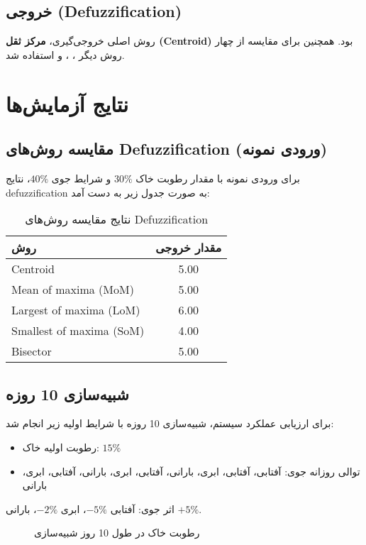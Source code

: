 \documentclass[a4paper,12pt]{article}
\begin{document}
	\subsection{خروجی (Defuzzification)}
	روش اصلی خروجی‌گیری، \textbf{مرکز ثقل (Centroid)} بود. همچنین برای مقایسه از چهار روش دیگر ، ،  و  استفاده شد.
	
	\section{نتایج آزمایش‌ها}
	
	\subsection{مقایسه روش‌های Defuzzification (ورودی نمونه)}
	برای ورودی نمونه با مقدار رطوبت خاک \(30\%\) و شرایط جوی \(40\%\)، نتایج defuzzification به صورت جدول زیر به دست آمد:
	
	\begin{table}[h]
		\centering
		\caption{نتایج مقایسه روش‌های Defuzzification}
		\begin{tabular}{lc}
			\hline
			روش & مقدار خروجی \\
			\hline
			Centroid & 5.00 \\
			Mean of maxima (MoM) & 5.00 \\
			Largest of maxima (LoM) & 6.00 \\
			Smallest of maxima (SoM) & 4.00 \\
			Bisector & 5.00 \\
			\hline
		\end{tabular}
	\end{table}
	
	\subsection{شبیه‌سازی 10 روزه}
	برای ارزیابی عملکرد سیستم، شبیه‌سازی 10 روزه با شرایط اولیه زیر انجام شد:
	\begin{itemize}
		\item رطوبت اولیه خاک: \(15\%\)
		\item توالی روزانه جوی: آفتابی، آفتابی، ابری، بارانی، آفتابی، ابری، بارانی، آفتابی، ابری، بارانی
	\end{itemize}
	
	اثر جوی: آفتابی \(-5\%\)، ابری \(-2\%\)، بارانی \(+5\%\).
	
	\begin{figure}[h]
		\centering
		\caption{رطوبت خاک در طول 10 روز شبیه‌سازی}
	\end{figure}
	
\end{document}

